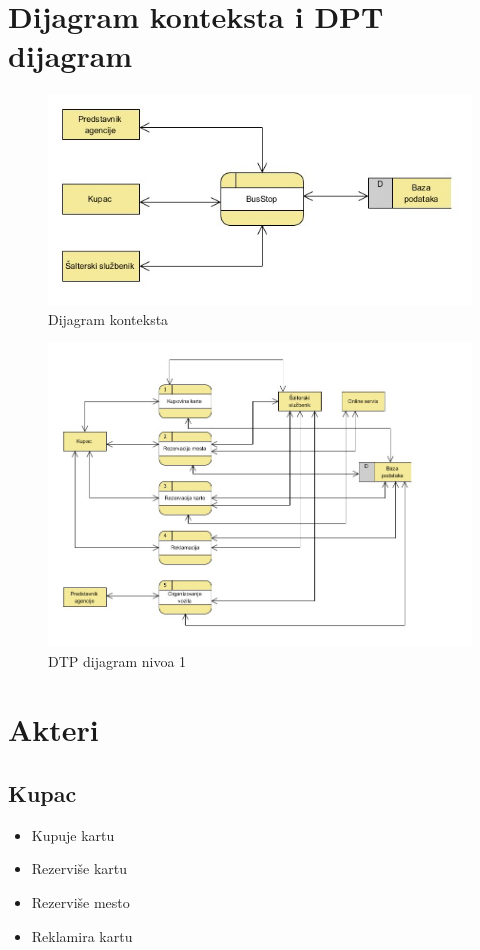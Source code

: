 \section{Dijagram konteksta i DPT dijagram}
\begin{figure}[!htb] 
	\centering
	\includegraphics{"../Slike/Dijagram konteksta"}
	\caption{Dijagram konteksta}
	\label{fig:dijagram-konteksta}
\end{figure}

\newpage

\begin{figure}[!htb]
	\centering
	\includegraphics[width=1.3\linewidth]{../Slike/DTP}
	\caption{DTP dijagram nivoa 1}
	\label{fig:dtp}
\end{figure}




\newpage
\section{Akteri}
\subsection{Kupac}
\begin{itemize}
	\item Kupuje kartu
	\item Rezervi\v se kartu
	\item Rezervi\v se mesto
	\item Reklamira kartu
\end{itemize}
